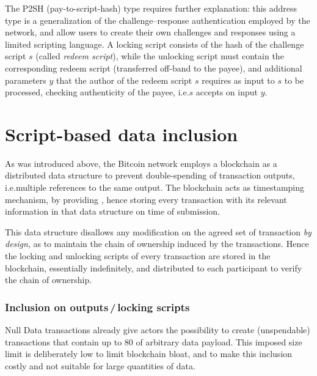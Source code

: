 \documentclass[a4paper,11pt,titlepage]{scrbook}
\begin{document}
The P2SH (pay-to-script-hash) type requires further explanation: this address type is a generalization of the challenge–response authentication employed by the network, and allow users to create their own challenges and responses using a limited scripting language.
A locking script consists of the hash of the challenge script $s$ (called \emph{redeem script}), while the unlocking script must contain the corresponding redeem script (transferred off-band to the payee), and additional parameters $y$ that the author of the redeem script $s$ requires as input to $s$ to be processed, checking authenticity of the payee, i.e.\@ $s$ accepts on input $y$.




\section{Script-based data inclusion}\label{sec:fakekeys}

As was introduced above, the Bitcoin network employs a blockchain as a distributed data structure to prevent double-spending of transaction outputs, i.e.\@ multiple references to the same output.
The blockchain acts as timestamping mechanism, by providing , hence storing every transaction with its relevant information in that data structure on time of submission.

This data structure disallows any modification on the agreed set of transaction \emph{by design}, 
as to maintain the chain of ownership induced by the transactions.
Hence the locking and unlocking scripts of every transaction are stored in the blockchain, essentially indefinitely, and distributed to each participant to verify the chain of ownership.

\subsubsection*{Inclusion on outputs\,/\,locking scripts}

Null Data transactions already give actors the possibility to create (unspendable) transactions that contain up to \SI{80}{\byte} of arbitrary data payload. This imposed size limit is deliberately low to limit blockchain bloat, and to make this inclusion costly and not suitable for large quantities of data. \cite[Cf.][155--156]{antonopoulos_mastering_2017}
\end{document}
